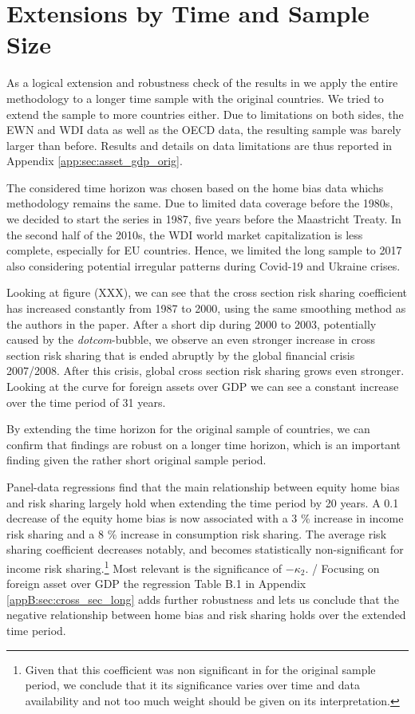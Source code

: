 \documentclass[11pt,a4paper]{article}
\begin{document}
\section{Extensions by Time and Sample Size}\label{sec:extensions_time}

As a logical extension and robustness check of the results in \textcite{main} we apply the entire methodology to a longer time sample with the original countries. We tried to extend the sample to more countries either. Due to limitations on both sides, the EWN and WDI data as well as the OECD data, the resulting sample was barely larger than before. Results and details on data limitations are thus reported in Appendix \ref{app:sec:asset_gdp_orig}.

The considered time horizon was chosen based on the home bias data whichs methodology remains the same. Due to limited data coverage before the 1980s, we decided to start the series in 1987, five years before the Maastricht Treaty. In the second half of the 2010s, the WDI world market capitalization is less complete, especially for EU countries. Hence, we limited the long sample to 2017 also considering potential irregular patterns during Covid-19 and Ukraine crises. 

Looking at figure (XXX), we can see that the cross section risk sharing coefficient has increased constantly from 1987
to 2000, using the same smoothing method as the authors in the paper. After a short dip during 2000 to 2003, potentially caused
by the \textit{dotcom}-bubble, we observe an even stronger increase in cross section risk sharing that is ended abruptly by the 
global financial crisis 2007/2008. After this crisis, global cross section risk sharing grows even stronger. 
Looking at the curve for foreign assets over GDP we can see a constant increase over the time period of 31 years.

By extending the time horizon for the original sample of countries, we can confirm that \textcite{main} findings
are robust on a longer time horizon, which is an important finding given the rather short original sample period. 

Panel-data regressions find that the main relationship between equity home bias and risk sharing largely hold when extending the 
time period by 20 years. A 0.1 decrease of the equity home bias is now associated with a 3 \% increase 
in income risk sharing and a 8 \% increase in consumption risk sharing. The average risk sharing coefficient decreases notably, and becomes 
statistically non-significant for income risk sharing.\footnote{Given that this coefficient was non significant in \textcite{main} for the original sample period, we conclude that it its significance varies over time and data availability and not too much weight should be given on its interpretation.} Most relevant is the significance of \(-\kappa_2\). /
Focusing on foreign asset over GDP the regression Table B.1  in Appendix \ref{appB:sec:cross_sec_long} adds further robustness and lets us conclude that the negative relationship between home bias and risk sharing holds over the extended time period.

\end{document}
